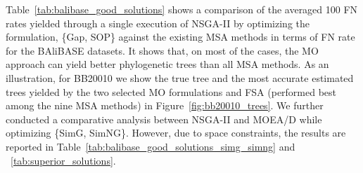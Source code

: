 Table~\ref{tab:balibase_good_solutions} shows a comparison of the averaged 100 FN rates yielded through a single execution of NSGA-II by optimizing the formulation, \{Gap, SOP\} against the existing MSA methods in terms of FN rate for the BAliBASE datasets. It shows that, on most of the cases, the MO approach can yield better phylogenetic trees than all MSA methods. As an illustration, for BB20010 we show the true tree and the most accurate estimated trees yielded by the two selected MO formulations and FSA (performed best among the nine MSA methods) in Figure~\ref{fig:bb20010_trees}. We further conducted a comparative analysis between NSGA-II and MOEA/D while optimizing \{SimG, SimNG\}. However, due to space constraints, the results are reported in Table~\ref{tab:balibase_good_solutions_simg_simng} and ~\ref{tab:superior_solutions}.
